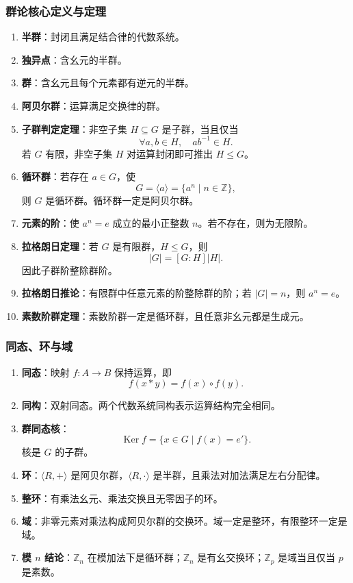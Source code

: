 \subsubsection{群论核心定义与定理}

\begin{enumerate}
	\item \textbf{半群}：封闭且满足结合律的代数系统。
	\item \textbf{独异点}：含幺元的半群。
	\item \textbf{群}：含幺元且每个元素都有逆元的半群。
	\item \textbf{阿贝尔群}：运算满足交换律的群。
	\item \textbf{子群判定定理}：非空子集 \(H\subseteq G\) 是子群，当且仅当
	\[
	\forall a,b\in H,\quad ab^{-1}\in H.
	\]
	若 \(G\) 有限，非空子集 \(H\) 对运算封闭即可推出 \(H\le G\)。
	\item \textbf{循环群}：若存在 \(a\in G\)，使
	\[
	G=\langle a\rangle=\{a^n\mid n\in\mathbb Z\},
	\]
	则 \(G\) 是循环群。循环群一定是阿贝尔群。
	\item \textbf{元素的阶}：使 \(a^n=e\) 成立的最小正整数 \(n\)。若不存在，则为无限阶。
	\item \textbf{拉格朗日定理}：若 \(G\) 是有限群，\(H\le G\)，则
	\[
	|G|=[G:H]|H|.
	\]
	因此子群阶整除群阶。
	\item \textbf{拉格朗日推论}：有限群中任意元素的阶整除群的阶；若 \(|G|=n\)，则 \(a^n=e\)。
	\item \textbf{素数阶群定理}：素数阶群一定是循环群，且任意非幺元都是生成元。
\end{enumerate}

\subsubsection{同态、环与域}

\begin{enumerate}
	\item \textbf{同态}：映射 \(f:A\to B\) 保持运算，即
	\[
	f(x*y)=f(x)\circ f(y).
	\]
	\item \textbf{同构}：双射同态。两个代数系统同构表示运算结构完全相同。
	\item \textbf{群同态核}：
	\[
	\operatorname{Ker}f=\{x\in G\mid f(x)=e'\}.
	\]
	核是 \(G\) 的子群。
	\item \textbf{环}：\(\langle R,+\rangle\) 是阿贝尔群，\(\langle R,\cdot\rangle\) 是半群，且乘法对加法满足左右分配律。
	\item \textbf{整环}：有乘法幺元、乘法交换且无零因子的环。
	\item \textbf{域}：非零元素对乘法构成阿贝尔群的交换环。域一定是整环，有限整环一定是域。
	\item \textbf{模 \(n\) 结论}：\(\mathbb Z_n\) 在模加法下是循环群；\(\mathbb Z_n\) 是有幺交换环；\(\mathbb Z_p\) 是域当且仅当 \(p\) 是素数。
\end{enumerate}

